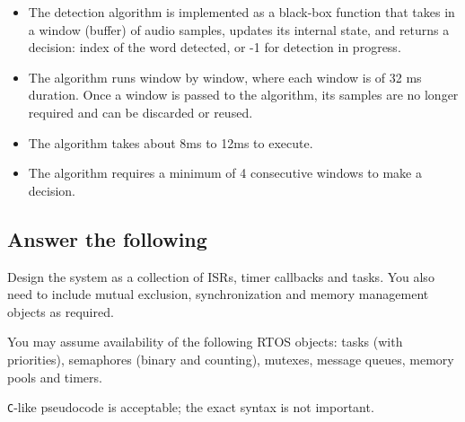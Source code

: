 \begin{itemize}[topsep=0pt]
      \item The detection algorithm is implemented as a black-box function that takes in a window (buffer) of audio samples, updates its internal state, and returns a decision: index of the word detected, or -1 for detection in progress.

      \item The algorithm runs window by window, where each window is of 32 ms duration.
            Once a window is passed to the algorithm, its samples are no longer required and can be discarded or reused.

      \item The algorithm takes about 8ms to 12ms to execute.

      \item The algorithm requires a minimum of 4 consecutive windows to make a decision.
\end{itemize}

\vspace*{-1.5em}
\subsection*{Answer the following}
\vspace*{-0.5em}

Design the system as a collection of ISRs, timer callbacks and tasks.
You also need to include mutual exclusion, synchronization and memory management objects as required.

You may assume availability of the following RTOS objects: tasks (with priorities), semaphores (binary and counting), mutexes, message queues, memory pools and timers.

\texttt{C}-like pseudocode is acceptable; the exact syntax is not important.
